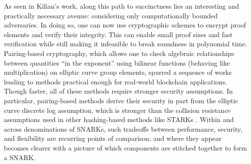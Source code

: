 \noindent As seen in Kilian's work, along this path to succinctness lies an interesting and practically necessary avenue: considering only computationally bounded adversaries. In doing so, one can now use cryptographic schemes to encrypt proof elements and verify their integrity. This can enable small proof sizes and fast verification while still making it infeasible to break soundness in polynomial time. Pairing-based cryptography, which allows one to check algebraic relationships between quantities ``in the exponent'' using bilinear functions (behaving like multiplication) on elliptic curve group elements, spurred a sequence of works leading to methods practical enough for real-world blockchain applications. Though faster, all of these methods require stronger security assumptions. In particular, pairing-based methods derive their security in part from the elliptic curve discrete log assumption, which is stronger than the collision resistance assumptions used in other hashing-based methods like STARKs \cite{starks}. Within and across denominations of SNARKs, such tradeoffs between performance, security, and flexibility are recurring points of comparison; and where they appear becomes clearer with a picture of which components are stitched together to form a SNARK.



